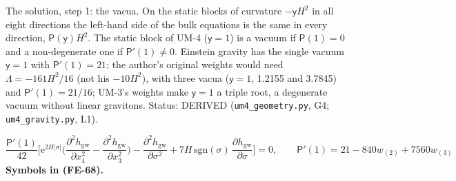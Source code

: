 \documentclass[
  10pt,
]{article}
\begin{document}
The solution, step 1: the vacua. On the static blocks of curvature
\(-\mathsf{y}H^2\) in all eight directions the left-hand side of the
bulk equations is the same in every direction,
\(\mathsf{P}(\mathsf{y})H^2\). The static block of UM-4
(\(\mathsf{y} = 1\)) is a vacuum if \(\mathsf{P}(1) = 0\) and a
non-degenerate one if \(\mathsf{P}'(1) \ne 0\). Einstein gravity has the
single vacuum \(\mathsf{y} = 1\) with \(\mathsf{P}'(1) = 21\); the
author's original weights would need \(\Lambda = -161H^2/16\) (not his
\(-10H^2\)), with three vacua (\(\mathsf{y} = 1\), 1.2155 and 3.7845)
and \(\mathsf{P}'(1) = 21/16\); UM-3's weights make \(\mathsf{y} = 1\) a
triple root, a degenerate vacuum without linear gravitons. Status:
DERIVED (\texttt{um4\_geometry.py}, G4; \texttt{um4\_gravity.py}, L1).

\[
\frac{\mathsf{P}'(1)}{42}\Big[\mathrm{e}^{2H\lvert\sigma\rvert}\Big(\frac{\partial^2h_{\mathrm{gw}}}{\partial x_4^2}
 - \frac{\partial^2h_{\mathrm{gw}}}{\partial x_3^2}\Big) - \frac{\partial^2h_{\mathrm{gw}}}{\partial\sigma^2}
 + 7H\,\mathrm{sgn}(\sigma)\,\frac{\partial h_{\mathrm{gw}}}{\partial\sigma}\Big] = 0,\qquad
\mathsf{P}'(1) = 21 - 840w_{(2)} + 7560w_{(3)} \tag{FE-68}
\] \textbf{Symbols in (FE-68).}
\end{document}
